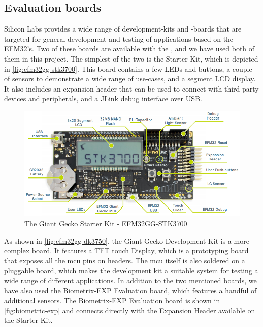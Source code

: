 \subsection{Evaluation boards}

Silicon Labs provides a wide range of development-kits and -boards that are targeted for general development and testing of applications based on the EFM32's.
Two of these boards are available with the {\gecko}, and we have used both of them in this project.
The simplest of the two is the  Starter Kit, which is depicted in \autoref{fig:efm32gg-stk3700}.
This board contains a few LEDs and buttons, a couple of sensors to demonstrate a wide range of use-cases, and a segment LCD display.
It also includes an expansion header that can be used to connect with third party devices and peripherals, and a JLink debug interface over USB.

\begin{figure}[H]
  \begin{center}
    \includegraphics[scale=0.4]{figures/efm32gg-stk3700}
  \end{center}
  \caption{The Giant Gecko Starter Kit - EFM32GG-STK3700 \cite{Labs2013_STK} }
  \label{fig:efm32gg-stk3700}
\end{figure}

As shown in \autoref{fig:efm32gg-dk3750}, the Giant Gecko Development Kit is a more complex board.
It features a TFT touch Display, which is a prototyping board that exposes all the \gls{mcu} pins on headers.
The \gls{mcu} itself is also soldered on a pluggable board, which makes the development kit a suitable system for testing a wide range of different applications.
In addition to the two mentioned boards, we have also used the Biometrix-EXP Evaluation board, which features a handful of additional sensors.
The Biometrix-EXP Evaluation board is shown in \autoref{fig:biometric-exp} and connects directly with the Expansion Header available on the Starter Kit.

